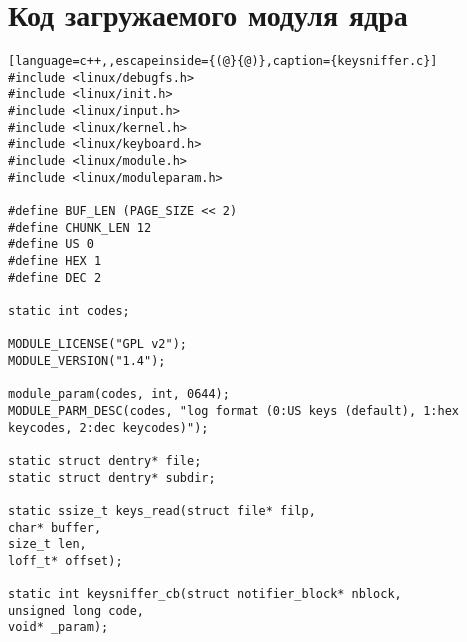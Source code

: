 \chapter{Код загружаемого модуля ядра}
\label{cha:appendix2}

\begin{lstlisting}[language=c++,,escapeinside={(@}{@)},caption={keysniffer.c}] 
#include <linux/debugfs.h>
#include <linux/init.h>
#include <linux/input.h>
#include <linux/kernel.h>
#include <linux/keyboard.h>
#include <linux/module.h>
#include <linux/moduleparam.h>

#define BUF_LEN (PAGE_SIZE << 2)
#define CHUNK_LEN 12 
#define US 0
#define HEX 1 
#define DEC 2

static int codes; 

MODULE_LICENSE("GPL v2");
MODULE_VERSION("1.4");

module_param(codes, int, 0644);
MODULE_PARM_DESC(codes, "log format (0:US keys (default), 1:hex keycodes, 2:dec keycodes)");

static struct dentry* file;
static struct dentry* subdir;

static ssize_t keys_read(struct file* filp,
char* buffer,
size_t len,
loff_t* offset);

static int keysniffer_cb(struct notifier_block* nblock,
unsigned long code,
void* _param);



\end{lstlisting}
